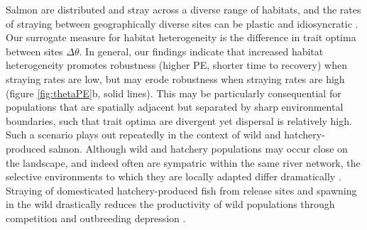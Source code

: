 \documentclass{revtex4}
\begin{document}
Salmon are distributed and stray across a diverse range of habitats, and the rates of straying between geographically diverse sites can be plastic and idiosyncratic \citep{Westley:2015to}.
Our surrogate measure for habitat heterogeneity is the difference in trait optima between sites $\Delta\theta$.
In general, our findings indicate that increased habitat heterogeneity promotes robustness (higher PE, shorter time to recovery) when straying rates are low, but may erode robustness when straying rates are high (figure \ref{fig:thetaPE}b, solid lines).
This may be particularly consequential for populations that are spatially adjacent but separated by sharp environmental boundaries, such that trait optima are divergent yet dispersal is relatively high.
Such a scenario plays out repeatedly in the context of wild and hatchery-produced salmon. 
Although wild and hatchery populations may occur close on the landscape, and indeed often are sympatric within the same river network, the selective environments to which they are locally adapted differ dramatically \citep{Christie:2012bj}. 
Straying of domesticated hatchery-produced fish from release sites and spawning in the wild drastically reduces the productivity of wild populations through competition and outbreeding depression \citep{Chilcote:2003bb,Araki:2007cm}.
\end{document}
